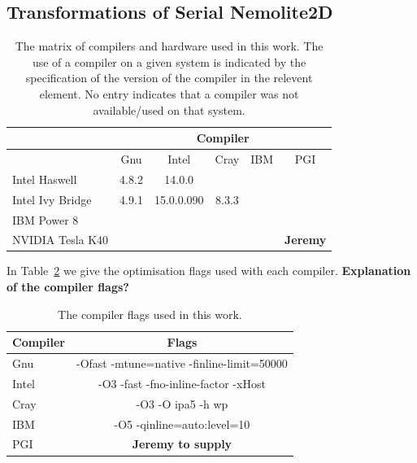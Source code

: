 \documentclass[journal]{IEEEtran}
\newcommand{\psykal}{{PS}y{KA}l\ }
\begin{document}
\subsection{Transformations of Serial Nemolite2D}

%
\begin{table}[!t]
\renewcommand{\arraystretch}{1.3}
\caption{The matrix of compilers and hardware used in this work. The
  use of a compiler on a given system is indicated by the specification
  of the version of the compiler in the relevent element. No entry
  indicates that a compiler was not available/used on that system.}
\label{TABLE_compilers}
\centering
\begin{tabular}{|l|c|c|c|c|c|}
\hline
                 & \multicolumn{5}{c|}{Compiler}            \\
\hline
                 & Gnu   & Intel       & Cray    & IBM    &  PGI \\
\hline
Intel Haswell    & 4.8.2 & 14.0.0      &         &        &  \\
Intel Ivy Bridge & 4.9.1 & 15.0.0.090  & 8.3.3   &        &  \\
IBM Power 8      &       &             &         &        &  \\
NVIDIA Tesla K40 &       &             &         &        &  {\bf Jeremy} \\
\hline
\end{tabular}
\end{table}

In Table~\ref{TABLE_compiler_flags} we give the optimisation flags
used with each compiler. {\bf Explanation of the compiler flags?}
 
\begin{table}[!t]
\renewcommand{\arraystretch}{1.3}
\caption{The compiler flags used in this work.}
\label{TABLE_compiler_flags}
\centering
\begin{tabular}{l|c}
\hline
Compiler  &  Flags \\
\hline
Gnu       & -Ofast -mtune=native -finline-limit=50000    \\
Intel     & -O3 -fast -fno-inline-factor -xHost   \\
Cray      & -O3 -O ipa5 -h wp               \\
IBM       & -O5 -qinline=auto:level=10      \\
PGI       & {\bf Jeremy to supply} \\
\hline
\end{tabular}
\end{table}
\end{document}
